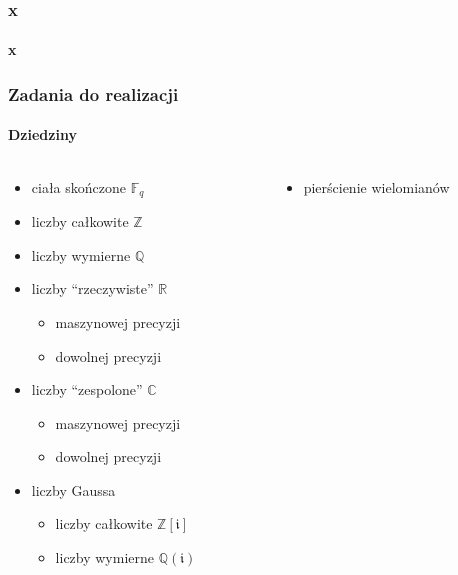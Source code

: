 \documentclass{beamer}
\begin{document}
\begin{frame}
    \frametitle{x}
    \framesubtitle{x}

\end{frame}

\begin{frame}
    \frametitle{Zadania do realizacji}
    \framesubtitle{Dziedziny }

    \begin{columns}
        \begin{column}[l]{0.5\textwidth}
            \begin{itemize}
                \item ciała skończone $\mathbb{F}_q$
                \item liczby całkowite $\mathbb{Z}$
                \item liczby wymierne $\mathbb{Q}$
                \item liczby ``rzeczywiste'' $\mathbb{R}$
                    \begin{itemize}
                        \item maszynowej precyzji
                        \item dowolnej precyzji
                    \end{itemize}
                \item liczby ``zespolone'' $\mathbb{C}$
                    \begin{itemize}
                        \item maszynowej precyzji
                        \item dowolnej precyzji
                    \end{itemize}
                \item liczby Gaussa
                    \begin{itemize}
                        \item liczby całkowite $\mathbb{Z}[\mathfrak{i}]$
                        \item liczby wymierne $\mathbb{Q}(\mathfrak{i})$
                    \end{itemize}
            \end{itemize}
        \end{column}
        \begin{column}[r]{0.5\textwidth}
            \begin{itemize}
                \item pierścienie wielomianów
                    \begin{itemize}

\end{itemize}
\end{itemize}
\end{column}
\end{columns}
\end{frame}
\end{document}
